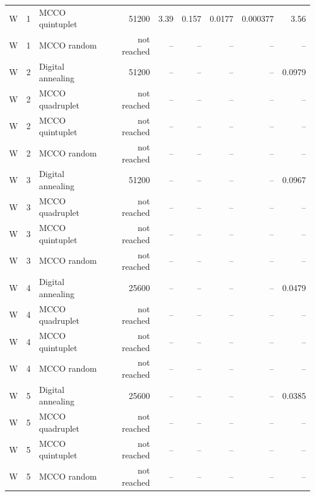 \begin{tabular}{lrlrrrrrr}
W & 1 & MCCO quintuplet & 51200 & 3.39 & 0.157 & 0.0177 & 0.000377 & 3.56 \\
W & 1 & MCCO random & not reached & -- & -- & -- & -- & -- \\
W & 2 & Digital annealing & 51200 & -- & -- & -- & -- & 0.0979 \\
W & 2 & MCCO quadruplet & not reached & -- & -- & -- & -- & -- \\
W & 2 & MCCO quintuplet & not reached & -- & -- & -- & -- & -- \\
W & 2 & MCCO random & not reached & -- & -- & -- & -- & -- \\
W & 3 & Digital annealing & 51200 & -- & -- & -- & -- & 0.0967 \\
W & 3 & MCCO quadruplet & not reached & -- & -- & -- & -- & -- \\
W & 3 & MCCO quintuplet & not reached & -- & -- & -- & -- & -- \\
W & 3 & MCCO random & not reached & -- & -- & -- & -- & -- \\
W & 4 & Digital annealing & 25600 & -- & -- & -- & -- & 0.0479 \\
W & 4 & MCCO quadruplet & not reached & -- & -- & -- & -- & -- \\
W & 4 & MCCO quintuplet & not reached & -- & -- & -- & -- & -- \\
W & 4 & MCCO random & not reached & -- & -- & -- & -- & -- \\
W & 5 & Digital annealing & 25600 & -- & -- & -- & -- & 0.0385 \\
W & 5 & MCCO quadruplet & not reached & -- & -- & -- & -- & -- \\
W & 5 & MCCO quintuplet & not reached & -- & -- & -- & -- & -- \\
W & 5 & MCCO random & not reached & -- & -- & -- & -- & -- \\
\hline
\end{tabular}

